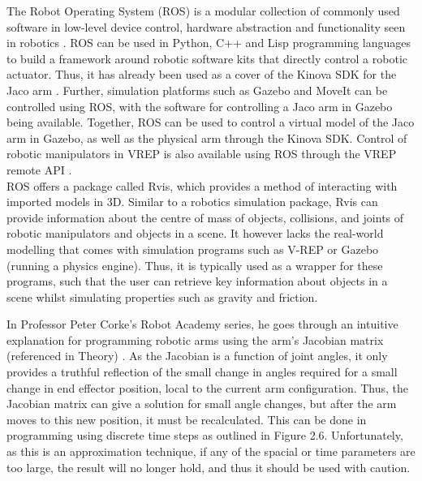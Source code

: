 \documentclass[12pt,openany,a4paper]{book}
\begin{document}
The Robot Operating System (ROS) is a modular collection of commonly used software in low-level device control, hardware abstraction and functionality seen in robotics \cite{ROSTech}. ROS can be used in Python, C++ and Lisp programming languages to build a framework around robotic software kits that directly control a robotic actuator. Thus, it has already been used as a cover of the Kinova SDK for the Jaco arm \cite{kinova-ros}. Further, simulation platforms such as Gazebo and MoveIt can be controlled using ROS, with the software for controlling a Jaco arm in Gazebo being available. Together, ROS can be used to control a virtual model of the Jaco arm in Gazebo, as well as the physical arm through the Kinova SDK. Control of robotic manipulators in VREP is also available using ROS through the VREP remote API \cite{models}.\\
ROS offers a package called Rvis, which provides a method of interacting with imported models in 3D. Similar to a robotics simulation package, Rvis can provide information about the centre of mass of objects, collisions, and joints of robotic manipulators and objects in a scene. It however lacks the real-world modelling that comes with simulation programs such as V-REP or Gazebo (running a physics engine). Thus, it is typically used as a wrapper for these programs, such that the user can retrieve key information about objects in a scene whilst simulating properties such as gravity and friction.


In Professor Peter Corke's Robot Academy series, he goes through an intuitive explanation for programming robotic arms using the arm's Jacobian matrix (referenced in Theory) \cite{robotacademy2}. As the Jacobian is a function of joint angles, it only provides a truthful reflection of the small change in angles required for a small change in end effector position, local to the current arm configuration. Thus, the Jacobian matrix can give a solution for small angle changes, but after the arm moves to this new position, it must be recalculated. This can be done in programming using discrete time steps as outlined in Figure 2.6. Unfortunately, as this is an approximation technique, if any of the spacial or time parameters are too large, the result will no longer hold, and thus it should be used with caution.
\end{document}

